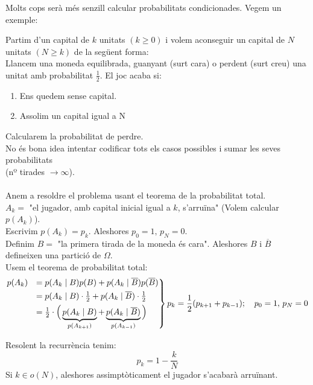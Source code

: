 Molts cops serà més senzill calcular probabilitats condicionades. Vegem un exemple:
\begin{example}
  Partim d'un capital de $k$ unitats $(k \geq 0)$ i volem aconseguir un capital de $N$ unitats $(N\geq k)$ de la següent forma: \\
  Llancem una moneda equilibrada, guanyant (surt cara) o perdent (surt creu) una unitat amb probabilitat $\frac{1}{2}$. El joc acaba si: 
  \begin{enumerate}
      \item Ens quedem sense capital.
      \item Assolim un capital igual a N
  \end{enumerate}
  Calcularem la probabilitat de perdre. \\
  No és bona idea intentar codificar tots els casos possibles i sumar les seves probabilitats \\ (nº tirades $\to \infty$). \\\\
  
  Anem a resoldre el problema usant el teorema de la probabilitat total. \\
  $A_{k} = $ "el jugador, amb capital inicial igual a $k$, s'arruïna" (Volem calcular $p(A_{k})$). \\
  Escrivim $p(A_{k}) = p_{k}$. Aleshores $p_{0} = 1, \, p_{N} = 0$. \\
  Definim $B =$ "la primera tirada de la moneda és cara". Aleshores $B$ i $\overline{B}$ defineixen una partició de $\Omega$. \\
  Usem el teorema de probabilitat total:
  \[
    \begin{rcases}
        p(A_{k}) &= p(A_{k} \mid B)p(B) + p(A_{k}\mid \overline{B})p(\overline{B}) \\
        &= p(A_{k}\mid B)\cdot\frac{1}{2} + p(A_{k}\mid\overline{B})\cdot\frac{1}{2} \\
        &= \frac{1}{2} \cdot\Big( \underbrace{p(A_{k}\mid B)}_{p(A_{k+1})} + \underbrace{p(A_{k}\mid\overline{B})}_{p(A_{k-1})}\Big)
    \end{rcases} p_{k} = \frac{1}{2}(p_{k+1} + p_{k-1}); \quad p_{0} = 1, \, p_{N} = 0
  \]
  
  Resolent la recurrència tenim: 
  \[
    p_{k} = 1 - \frac{k}{N}
  \]
  Si $k \in o(N)$, aleshores assimptòticament el jugador s'acabarà arruïnant.
\end{example}
